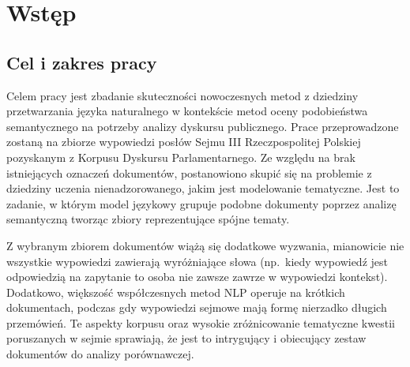 
\chapter{Wstęp}
 
\section{Cel i zakres pracy}
	Celem pracy jest zbadanie skuteczności nowoczesnych metod z dziedziny przetwarzania języka naturalnego
		w kontekście metod oceny podobieństwa semantycznego na potrzeby analizy dyskursu publicznego.
	Prace przeprowadzone zostaną na zbiorze wypowiedzi posłów Sejmu III Rzeczpospolitej Polskiej pozyskanym z Korpusu Dyskursu Parlamentarnego.
	Ze względu na brak istniejących oznaczeń dokumentów, postanowiono skupić się na problemie z dziedziny uczenia nienadzorowanego, jakim jest modelowanie tematyczne.
	Jest to zadanie, w którym model językowy grupuje podobne dokumenty poprzez analizę semantyczną tworząc zbiory reprezentujące spójne tematy.

	Z wybranym zbiorem dokumentów wiążą się dodatkowe wyzwania, mianowicie nie wszystkie wypowiedzi zawierają wyróżniające słowa
		(np.\ kiedy wypowiedź jest odpowiedzią na zapytanie to osoba nie zawsze zawrze w wypowiedzi kontekst).
	Dodatkowo, większość współczesnych metod NLP operuje na krótkich dokumentach, podczas gdy wypowiedzi sejmowe mają formę nierzadko długich przemówień.
	Te aspekty korpusu oraz wysokie zróżnicowanie tematyczne kwestii poruszanych w sejmie sprawiają,
		że jest to intrygujący i obiecujący zestaw dokumentów do analizy porównawczej.


